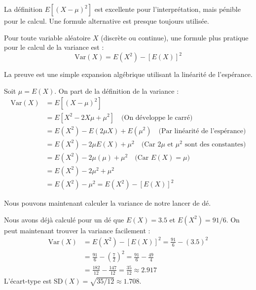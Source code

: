 La définition $E[(X-\mu)^2]$ est excellente pour l'interprétation, mais pénible pour le calcul. Une formule alternative est presque toujours utilisée.

\begin{theorembox}
Pour toute variable aléatoire $X$ (discrète ou continue), une formule plus pratique pour le calcul de la variance est :
$$\text{Var}(X) = E(X^2) - [E(X)]^2$$
\end{theorembox}

La preuve est une simple expansion algébrique utilisant la linéarité de l'espérance.

\begin{proofbox}
Soit $\mu = E(X)$. On part de la définition de la variance :
\begin{align*}
\text{Var}(X) &= E[ (X - \mu)^2 ] \\
&= E[ X^2 - 2X\mu + \mu^2 ] \quad \text{(On développe le carré)} \\
&= E(X^2) - E(2\mu X) + E(\mu^2) \quad \text{(Par linéarité de l'espérance)} \\
&= E(X^2) - 2\mu E(X) + \mu^2 \quad \text{(Car $2\mu$ et $\mu^2$ sont des constantes)} \\
&= E(X^2) - 2\mu(\mu) + \mu^2 \quad \text{(Car $E(X) = \mu$)} \\
&= E(X^2) - 2\mu^2 + \mu^2 \\
&= E(X^2) - \mu^2 = E(X^2) - [E(X)]^2
\end{align*}
\end{proofbox}

Nous pouvons maintenant calculer la variance de notre lancer de dé.

\begin{examplebox}
Nous avons déjà calculé pour un dé que $E(X) = 3.5$ et $E(X^2) = 91/6$. On peut maintenant trouver la variance facilement :
\begin{align*}
\text{Var}(X) &= E(X^2) - [E(X)]^2 = \frac{91}{6} - (3.5)^2 \\
&= \frac{91}{6} - \left(\frac{7}{2}\right)^2 = \frac{91}{6} - \frac{49}{4} \\
&= \frac{182}{12} - \frac{147}{12} = \frac{35}{12} \approx 2.917
\end{align*}
L'écart-type est $\text{SD}(X) = \sqrt{35/12} \approx 1.708$.
\end{examplebox}
